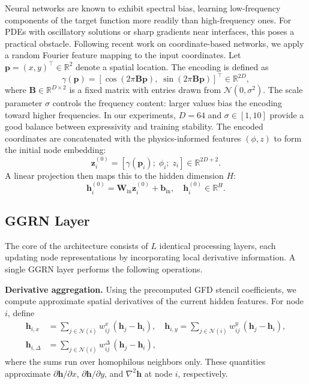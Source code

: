 \documentclass[11pt]{article}
\theoremstyle{definition}
\theoremstyle{remark}
\theoremstyle{plain}
\begin{document}
Neural networks are known to exhibit spectral bias, learning low-frequency components of the target function more readily than high-frequency ones. For PDEs with oscillatory solutions or sharp gradients near interfaces, this poses a practical obstacle. Following recent work on coordinate-based networks, we apply a random Fourier feature mapping to the input coordinates. Let $\mathbf{p} = (x, y)^\top \in \mathbb{R}^2$ denote a spatial location. The encoding is defined as
\begin{equation}
    \gamma(\mathbf{p}) = \left[ \cos(2\pi \mathbf{B} \mathbf{p}), \; \sin(2\pi \mathbf{B} \mathbf{p}) \right]^\top \in \mathbb{R}^{2D},
\end{equation}
where $\mathbf{B} \in \mathbb{R}^{D \times 2}$ is a fixed matrix with entries drawn from $\mathcal{N}(0, \sigma^2)$. The scale parameter $\sigma$ controls the frequency content: larger values bias the encoding toward higher frequencies. In our experiments, $D = 64$ and $\sigma \in [1, 10]$ provide a good balance between expressivity and training stability. The encoded coordinates are concatenated with the physics-informed features $(\phi, z)$ to form the initial node embedding:
\begin{equation}
    \mathbf{z}_i^{(0)} = \left[ \gamma(\mathbf{p}_i); \; \phi_i; \; z_i \right] \in \mathbb{R}^{2D + 2}.
\end{equation}
A linear projection then maps this to the hidden dimension $H$:
\begin{equation}
    \mathbf{h}_i^{(0)} = \mathbf{W}_{\text{in}} \mathbf{z}_i^{(0)} + \mathbf{b}_{\text{in}}, \quad \mathbf{h}_i^{(0)} \in \mathbb{R}^H.
\end{equation}

\subsection{GGRN Layer}

The core of the architecture consists of $L$ identical processing layers, each updating node representations by incorporating local derivative information. A single GGRN layer performs the following operations.

\textbf{Derivative aggregation.} Using the precomputed GFD stencil coefficients, we compute approximate spatial derivatives of the current hidden features. For node $i$, define
\begin{equation}
\begin{aligned}
    \mathbf{h}_{i,x} &= \sum_{j \in \mathcal{N}(i)} w_{ij}^x \, (\mathbf{h}_j - \mathbf{h}_i), \quad
    \mathbf{h}_{i,y} = \sum_{j \in \mathcal{N}(i)} w_{ij}^y \, (\mathbf{h}_j - \mathbf{h}_i), \\
    \mathbf{h}_{i,\Delta} &= \sum_{j \in \mathcal{N}(i)} w_{ij}^{\Delta} \, (\mathbf{h}_j - \mathbf{h}_i),
\end{aligned}
\end{equation}
where the sums run over homophilous neighbors only. These quantities approximate $\partial \mathbf{h} / \partial x$, $\partial \mathbf{h} / \partial y$, and $\nabla^2 \mathbf{h}$ at node $i$, respectively.
\end{document}

